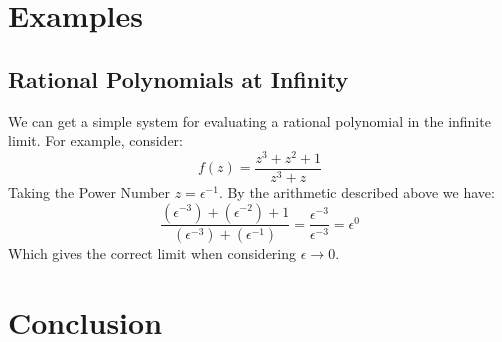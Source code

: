 \documentclass[acmsmall]{acmart}
\begin{document}
\section{Examples}

\subsection{Rational Polynomials at Infinity}
We can get a simple system for evaluating a rational polynomial in the infinite limit. For example, consider:
$$f(z) = \frac{z^3+z^2+1}{z^3+z}$$
Taking the Power Number $z = \epsilon^{-1}$. By the arithmetic described above we have:
$$\frac{(\epsilon^{-3})+(\epsilon^{-2})+1}{(\epsilon^{-3})+(\epsilon^{-1})} = \frac{\epsilon^{-3}}{\epsilon^{-3}}=\epsilon^0$$
Which gives the correct limit when considering $\epsilon \rightarrow 0$.


\section{Conclusion}
\end{document}
